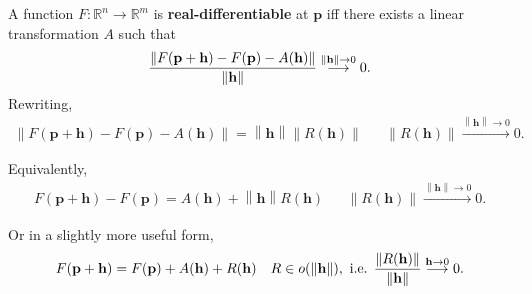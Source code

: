 \begin{definition}

A function \(F: {\mathbb{R}}^n\to {\mathbb{R}}^m\) is
\textbf{real-differentiable} at \(\mathbf{p}\) iff there exists a linear
transformation \(A\) such that
\begin{align*}
{ {\left\lVert { F(\mathbf{p} + \mathbf{h}) - F(\mathbf{p}) - A(\mathbf{h}) } \right\rVert} \over {\left\lVert { \mathbf{h} } \right\rVert} } \overset{{\left\lVert {\mathbf{h}} \right\rVert}\to 0}\longrightarrow 0
.\end{align*}
Rewriting,
\begin{align*}
{\left\lVert { F(\mathbf{p} + \mathbf{h}) - F(\mathbf{p})  - A(\mathbf{h}) } \right\rVert} = {\left\lVert { \mathbf{h} } \right\rVert} {\left\lVert { R(\mathbf{h}) } \right\rVert}
&& {\left\lVert {R(\mathbf{h}) } \right\rVert}\overset{{\left\lVert {\mathbf{h} } \right\rVert} \to 0}\longrightarrow 0
.\end{align*}

Equivalently,
\begin{align*}
F(\mathbf{p} + \mathbf{h}) - F(\mathbf{p}) = A(\mathbf{h}) + {\left\lVert {\mathbf{h}} \right\rVert} R(\mathbf{h}) && {\left\lVert {R(\mathbf{h}) } \right\rVert}\overset{{\left\lVert {\mathbf{h} } \right\rVert} \to 0}\longrightarrow 0
.\end{align*}

Or in a slightly more useful form,
\begin{align*}
F(\mathbf{p} + \mathbf{h}) = F(\mathbf{p}) + A(\mathbf{h}) + R(\mathbf{h}) && R\in o( {\left\lVert {\mathbf{h}} \right\rVert}), \text{ i.e. }
{ {\left\lVert { R(\mathbf{h}) } \right\rVert} \over  {\left\lVert {\mathbf{h}} \right\rVert}} \overset{\mathbf{h}\to 0}\longrightarrow 0
.\end{align*}

\end{definition}

